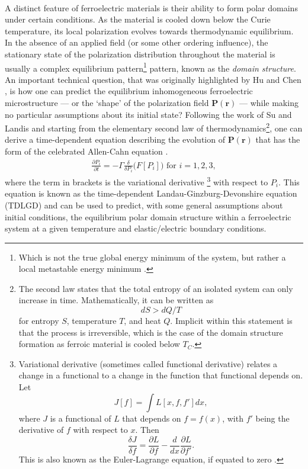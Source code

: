 \documentclass[22pt]{article} %
\begin{document}
\paragraph{}A distinct feature of ferroelectric materials is their ability to form polar domains under certain conditions.
%
As the material is cooled down below the Curie temperature, its local polarization evolves towards thermodynamic equilibrium.
%
In the absence of an applied field (or some other ordering influence), the stationary state of the polarization distribution throughout the material is usually a complex equilibrium pattern\footnote[1]{Which is not the true global energy minimum of the system, but rather a local metastable energy minimum \cite{Hu1998}.} pattern, known as the \emph{domain structure}.
%
An important technical question, that was originally highlighted by Hu and Chen \cite{Hu1998, Li2001}, is how one can predict the equilibrium inhomogeneous ferroelectric microstructure --- or the `shape' of the polarization field $\mathbf{P}(\mathbf{r})$ --- while making no particular assumptions about its initial state?
%
Following the work of Su and Landis \cite{Su2007} and starting from the elementary second law of thermodynamics\footnote[2]{The second law states that the total entropy of an isolated system can only increase in time.
%
Mathematically, it can be written as
%
$$dS > dQ/T$$
%
for entropy $S$, temperature $T$, and heat $Q$.
%
Implicit within this statement is that the process is irreversible, which is the case of the domain structure formation as ferroic material is cooled below $T_C$.}, one can derive a time-dependent equation describing the evolution of $\mathbf{P}(\mathbf{r})$ that has the form of the celebrated Allen-Cahn equation \cite{Chan1977, LandauBook, Allen1979}.
%
%
\begin{align}\label{eq:time-dependent_landau_ginzburg_devonshire}
\frac{\partial P_i}{\partial t} = -\Gamma \frac{\delta }{\delta P_i}\Bigg(F\left[P_i\right] \Bigg)\,\,\mathrm{for} \,\,i = 1,2,3,
\end{align}
%
where the term in brackets is the variational derivative \footnote[3]{Variational derivative (sometimes called functional derivative) relates a change in a functional to a change in the function that functional depends on.
%
Let
%
$$J[f] = \int L[x,f,f'] dx,$$
%
where $J$ is a functional of $L$ that depends on $f = f(x)$, with $f'$ being the derivative of $f$ with respect to $x$. Then
%
$$\frac{\delta J}{\delta f} = \frac{\partial L}{\partial f} - \frac{d}{dx} \frac{\partial L}{\partial f'}.$$
%
This is also known as the Euler-Lagrange equation, if equated to zero \cite{GelfandBook}.
} with respect to $P_i$.
%
This equation is known as the time-dependent Landau-Ginzburg-Devonshire equation (TDLGD) and can be used to predict, with some general assumptions about initial conditions, the equilibrium polar domain structure within a ferroelectric system at a given temperature and elastic/electric boundary conditions.
%
\end{document}
